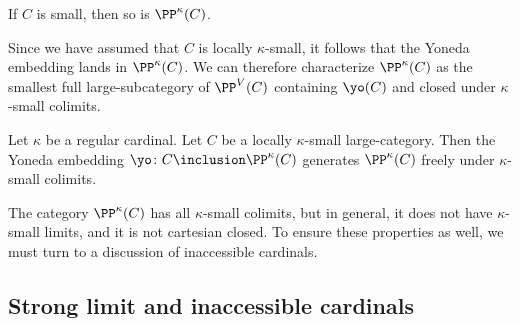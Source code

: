 \begin{nul}
	If $ C $ is small, then so is $ \PP^{\kappa}(C) $.
\end{nul}

\begin{nul}
	Since we have assumed that $ C $ is locally $ \kappa $-small,
	it follows that the Yoneda embedding lands in $ \PP^{\kappa}(C) $.
	We can therefore characterize $ \PP^{\kappa}(C) $
	as the smallest full large-subcategory of $ \PP^V(C) $
	containing $ \yo(C) $ and closed under $ \kappa $-small colimits.
\end{nul}

\begin{proposition}%
	\label{prp:PPkappaisfreelygenerated}
	Let $ \kappa $ be a regular cardinal.
	Let $ C $ be a locally $\kappa$-small large-category.
	Then the Yoneda embedding
	$ \yo \colon C \inclusion \PP^{\kappa}(C) $
	generates $ \PP^{\kappa}(C) $ freely under
	$ \kappa $-small colimits.
\end{proposition}

\begin{nul}
	The category $ \PP^{\kappa}(C) $
	has all $ \kappa $-small colimits, but
	in general, it does not have $ \kappa $-small limits, and
	it is not cartesian closed.
	To ensure these properties as well,
	we must turn to a discussion of inaccessible cardinals.
\end{nul}

\subsection{Strong limit and inaccessible cardinals}%
\label{sub:strong_limit_and_inaccessible_cardinals}

